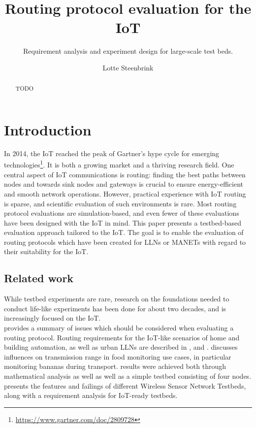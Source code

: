 \documentclass{acm_proc_article-sp}
\begin{document}
\title{Routing protocol evaluation for the IoT}
\subtitle{Requirement analysis and experiment design for large-scale test beds.}

\author{
\alignauthor
Lotte Steenbrink
}

\maketitle
\begin{abstract}
TODO
\end{abstract}


\section{Introduction}
\label{sec:Intro}
In 2014, the \gls{IoT} reached the peak of Gartner's hype cycle for emerging technologies\footnote{\url{https://www.gartner.com/doc/2809728}}. It is both a growing market and a thriving research field. One central aspect of IoT communications is routing: finding the best paths between nodes and towards sink nodes and gateways is crucial to ensure energy-efficient and smooth network operations. However, practical experience with IoT routing is sparse, and scientific evaluation of such environments is rare. Most routing protocol evaluations are simulation-based, and even fewer of these evaluations have been designed with the IoT in mind.
This paper presents a testbed-based evaluation approach tailored to the IoT. The goal is to enable the evaluation of routing protocols which have been created for \glspl{LLN} or \glspl{MANET} with regard to their suitability for the IoT.

\subsection{Related work}
\label{subsec:related_work}
While testbed experiments are rare, research on the foundations needed to conduct life-like experiments has been done for about two decades, and is increasingly focused on the IoT.\\
\cite{RFC-2501} provides a summary of issues which should be considered when evaluating a routing protocol. Routing requirements for the IoT-like scenarios of home and building automation, as well as urban \glspl{LLN} are described in \cite{RFC-5826}, \cite{RFC-5867} and \cite{RFC-5548}.
\cite{food_monitoring} discusses influences on transmission range in food monitoring use cases, in particular monitoring bananas during transport. results were achieved both through mathematical analysis as well as well as a simple testbed consisting of four nodes.
\cite{testbed-survey} presents the features and failings of different Wireless Sensor Network Testbeds, along with a requirement analysis for IoT-ready testbeds.
\end{document}
